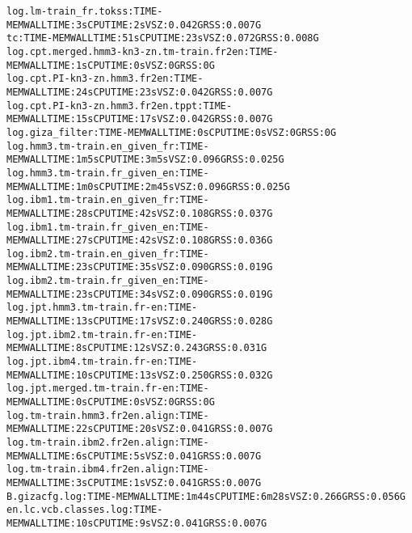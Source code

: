 \documentclass[11pt,letterpaper]{article}
\begin{document}
\begin{tiny}
\begin{alltt}
         log.lm-train_fr.tokss:TIME-MEM                       WALL TIME: 3s       CPU TIME: 2s         VSZ: 0.042G    RSS: 0.007G
      tc:TIME-MEM                                             WALL TIME: 51s      CPU TIME: 23s        VSZ: 0.072G    RSS: 0.008G
         log.cpt.merged.hmm3-kn3-zn.tm-train.fr2en:TIME-MEM   WALL TIME: 1s       CPU TIME: 0s         VSZ: 0G        RSS: 0G
         log.cpt.PI-kn3-zn.hmm3.fr2en:TIME-MEM                WALL TIME: 24s      CPU TIME: 23s        VSZ: 0.042G    RSS: 0.007G
         log.cpt.PI-kn3-zn.hmm3.fr2en.tppt:TIME-MEM           WALL TIME: 15s      CPU TIME: 17s        VSZ: 0.042G    RSS: 0.007G
         log.giza_filter:TIME-MEM                             WALL TIME: 0s       CPU TIME: 0s         VSZ: 0G        RSS: 0G
         log.hmm3.tm-train.en_given_fr:TIME-MEM               WALL TIME: 1m5s     CPU TIME: 3m5s       VSZ: 0.096G    RSS: 0.025G
         log.hmm3.tm-train.fr_given_en:TIME-MEM               WALL TIME: 1m0s     CPU TIME: 2m45s      VSZ: 0.096G    RSS: 0.025G
         log.ibm1.tm-train.en_given_fr:TIME-MEM               WALL TIME: 28s      CPU TIME: 42s        VSZ: 0.108G    RSS: 0.037G
         log.ibm1.tm-train.fr_given_en:TIME-MEM               WALL TIME: 27s      CPU TIME: 42s        VSZ: 0.108G    RSS: 0.036G
         log.ibm2.tm-train.en_given_fr:TIME-MEM               WALL TIME: 23s      CPU TIME: 35s        VSZ: 0.090G    RSS: 0.019G
         log.ibm2.tm-train.fr_given_en:TIME-MEM               WALL TIME: 23s      CPU TIME: 34s        VSZ: 0.090G    RSS: 0.019G
         log.jpt.hmm3.tm-train.fr-en:TIME-MEM                 WALL TIME: 13s      CPU TIME: 17s        VSZ: 0.240G    RSS: 0.028G
         log.jpt.ibm2.tm-train.fr-en:TIME-MEM                 WALL TIME: 8s       CPU TIME: 12s        VSZ: 0.243G    RSS: 0.031G
         log.jpt.ibm4.tm-train.fr-en:TIME-MEM                 WALL TIME: 10s      CPU TIME: 13s        VSZ: 0.250G    RSS: 0.032G
         log.jpt.merged.tm-train.fr-en:TIME-MEM               WALL TIME: 0s       CPU TIME: 0s         VSZ: 0G        RSS: 0G
         log.tm-train.hmm3.fr2en.align:TIME-MEM               WALL TIME: 22s      CPU TIME: 20s        VSZ: 0.041G    RSS: 0.007G
         log.tm-train.ibm2.fr2en.align:TIME-MEM               WALL TIME: 6s       CPU TIME: 5s         VSZ: 0.041G    RSS: 0.007G
         log.tm-train.ibm4.fr2en.align:TIME-MEM               WALL TIME: 3s       CPU TIME: 1s         VSZ: 0.041G    RSS: 0.007G
            B.gizacfg.log:TIME-MEM                            WALL TIME: 1m44s    CPU TIME: 6m28s      VSZ: 0.266G    RSS: 0.056G
            en.lc.vcb.classes.log:TIME-MEM                    WALL TIME: 10s      CPU TIME: 9s         VSZ: 0.041G    RSS: 0.007G

\end{alltt}
\end{tiny}
\end{document}
